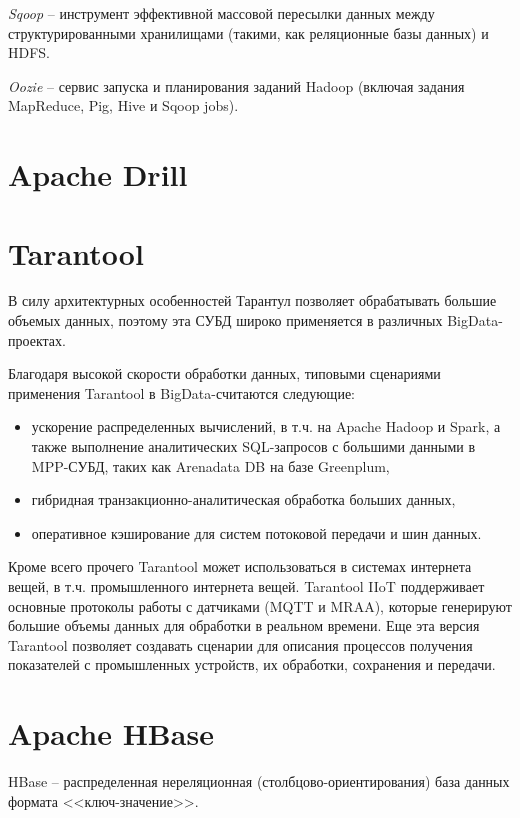 \documentclass[%
	11pt,
	a4paper,
	utf8,
		]{article}
\begin{document}
\emph{Sqoop} -- инструмент эффективной массовой пересылки данных между структурированными хранилищами (такими, как реляционные базы данных) и HDFS.

\emph{Oozie} -- сервис запуска и планирования заданий Hadoop (включая задания MapReduce, Pig, Hive и Sqoop jobs).

\section{Apache Drill}

\section{Tarantool}

В силу архитектурных особенностей Тарантул позволяет обрабатывать большие объемых данных, поэтому эта СУБД широко применяется в различных BigData-проектах.

Благодаря высокой скорости обработки данных, типовыми сценариями применения Tarantool в BigData-считаются следующие:
\begin{itemize}
	\item ускорение распределенных вычислений, в т.ч. на Apache Hadoop и Spark, а также выполнение аналитических SQL-запросов с большими данными в MPP-СУБД, таких как Arenadata DB на базе Greenplum,
	
	\item гибридная транзакционно-аналитическая обработка больших данных,
	
	\item оперативное кэширование для систем потоковой передачи и шин данных.
\end{itemize}

Кроме всего прочего Tarantool может использоваться в системах интернета вещей, в т.ч. промышленного интернета вещей. Tarantool IIoT поддерживает основные протоколы работы с датчиками (MQTT и MRAA), которые генерируют большие объемы данных для обработки в реальном времени. Еще эта версия Tarantool позволяет создавать сценарии для описания процессов получения показателей с промышленных устройств, их обработки, сохранения и передачи.




\section{Apache HBase}

HBase -- распределенная нереляционная (столбцово-ориентирования) база данных формата <<ключ-значение>>. 
\end{document}
